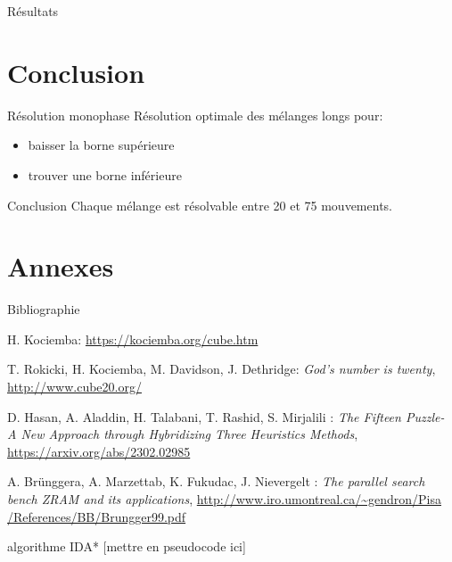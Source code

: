 \documentclass{beamer}
\begin{document}
	\begin{frame}{Résultats}
		
	\end{frame}
		
	\section{Conclusion}
	\begin{frame}{Résolution monophase}
		Résolution optimale des mélanges longs pour:
		\begin{itemize}
			\item baisser la borne supérieure
			\item trouver une borne inférieure
		\end{itemize}
	\end{frame}
	
	\begin{frame}{Conclusion}
		Chaque mélange est résolvable entre 20 et 75 mouvements.
	\end{frame}
	
	\section{Annexes}	
	\begin{frame}{Bibliographie}
		\begin{itemize}
			\small{
			\item H. Kociemba: \url{https://kociemba.org/cube.htm}
			\item T. Rokicki, H. Kociemba, M. Davidson, J. Dethridge: \textit{God's number is twenty},
			\url{http://www.cube20.org/}
			\item D. Hasan, A. Aladdin, H. Talabani, T. Rashid, S. Mirjalili : \textit{The Fifteen
			Puzzle- A New Approach through Hybridizing Three Heuristics Methods}, \url{https://arxiv.org/abs/2302.02985}
			\item A. Brünggera, A. Marzettab, K. Fukudac, J. Nievergelt : \textit{The parallel
			search bench ZRAM and its applications}, \url{http://www.iro.umontreal.ca/~gendron/Pisa
			/References/BB/Brungger99.pdf}
		}
		\end{itemize}
	\end{frame}
	
	\begin{frame}{algorithme IDA*}
		[mettre en pseudocode ici]
	\end{frame}
	
\end{document}
